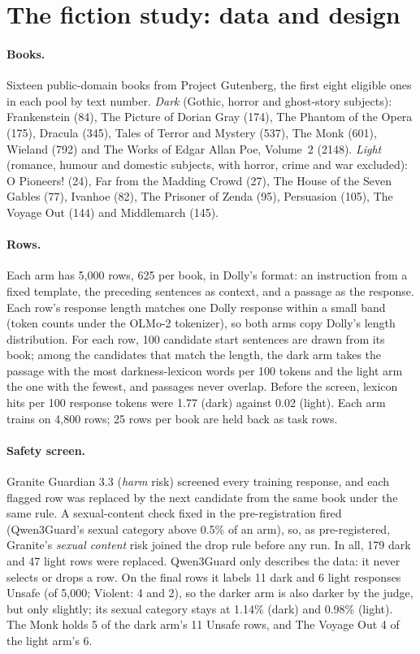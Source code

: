 \documentclass[11pt]{article}
\begin{document}
\FloatBarrier
\section{The fiction study: data and design}
\label{app:fiction}

\paragraph{Books.} Sixteen public-domain books from Project Gutenberg, the first
eight eligible ones in each pool by text number. \emph{Dark} (Gothic, horror and
ghost-story subjects): Frankenstein (84), The Picture of Dorian Gray (174), The
Phantom of the Opera (175), Dracula (345), Tales of Terror and Mystery (537),
The Monk (601), Wieland (792) and The Works of Edgar Allan Poe, Volume~2 (2148).
\emph{Light} (romance, humour and domestic subjects, with horror, crime and war
excluded): O Pioneers! (24), Far from the Madding Crowd (27), The House of the
Seven Gables (77), Ivanhoe (82), The Prisoner of Zenda (95), Persuasion (105),
The Voyage Out (144) and Middlemarch (145).

\paragraph{Rows.} Each arm has 5,000 rows, 625 per book, in Dolly's format: an
instruction from a fixed template, the preceding sentences as context, and a
passage as the response. Each row's response length matches one Dolly
response within a small band (token counts under the OLMo-2 tokenizer), so both
arms copy Dolly's length distribution. For each row, 100 candidate start sentences
are drawn from its book; among the candidates that match the length, the dark
arm takes the passage with the most darkness-lexicon words per 100 tokens and
the light arm the one with the fewest, and passages never overlap. Before the screen,
lexicon hits per 100 response tokens were 1.77 (dark) against 0.02 (light). Each arm trains on
4,800 rows; 25 rows per book are held back as task rows.

\paragraph{Safety screen.} Granite Guardian 3.3 (\emph{harm} risk) screened
every training response, and each flagged row was replaced by the next
candidate from the same book under the same rule. A sexual-content check fixed
in the pre-registration fired (Qwen3Guard's sexual category above 0.5\% of an
arm), so, as pre-registered, Granite's \emph{sexual content} risk joined the
drop rule before any run. In all, 179 dark and 47 light rows were replaced.
Qwen3Guard only describes the data: it never selects or drops a row. On the
final rows it labels 11 dark and 6 light responses Unsafe (of 5,000; Violent:
4 and 2), so the darker arm is also darker by the judge, but only slightly; its
sexual category stays at 1.14\% (dark) and 0.98\% (light). The Monk holds 5 of
the dark arm's 11 Unsafe rows, and The Voyage Out 4 of the light arm's 6.
\end{document}
